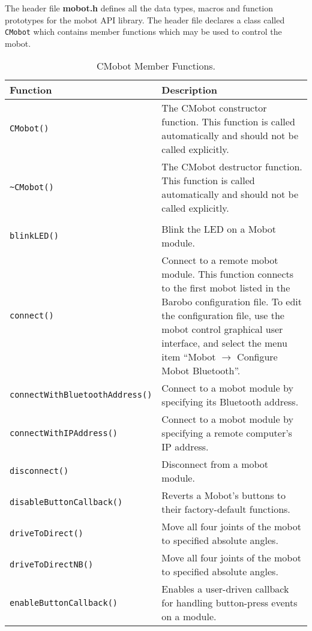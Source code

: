\noindent
The header file {\bf mobot.h} defines all the data types, macros 
and function prototypes for the mobot API library. The header file
declares a class called \texttt{CMobot} which contains member functions which
may be used to control the mobot.

\begin{table}[!h]
\begin{center}
\caption{CMobot Member Functions.}
\begin{tabular}{p{48 mm}p{110 mm}}
\hline
Function & Description \\
\hline
\texttt{CMobot()} & The CMobot constructor function. This function
is called automatically and should not be called explicitly. \\
\texttt{\textasciitilde CMobot()} & The CMobot destructor function. This function
is called automatically and should not be called explicitly. \\
& \\
\texttt{blinkLED()} & Blink the LED on a Mobot module. \\
\texttt{connect()} & Connect to a remote mobot module. This function 
connects to the first mobot listed in the Barobo configuration file. To
edit the configuration file, use the mobot control graphical user interface,
and select the menu item ``Mobot $\rightarrow$ Configure Mobot Bluetooth''. \\
\texttt{connectWithBluetoothAddress()} & Connect to a mobot module by specifying its Bluetooth address. \\
\texttt{connectWithIPAddress()} & Connect to a mobot module by specifying a remote computer's IP address. \\
\texttt{disconnect()} & Disconnect from a mobot module. \\
\texttt{disableButtonCallback()} & Reverts a Mobot's buttons to their factory-default functions. \\
\texttt{driveToDirect()} & Move all four joints of the mobot to specified absolute angles. \\
\texttt{driveToDirectNB()} & Move all four joints of the mobot to specified absolute angles. \\
\texttt{enableButtonCallback()} & Enables a user-driven callback for handling button-press events on a module. \\

\end{tabular}
\end{center}
\end{table}
